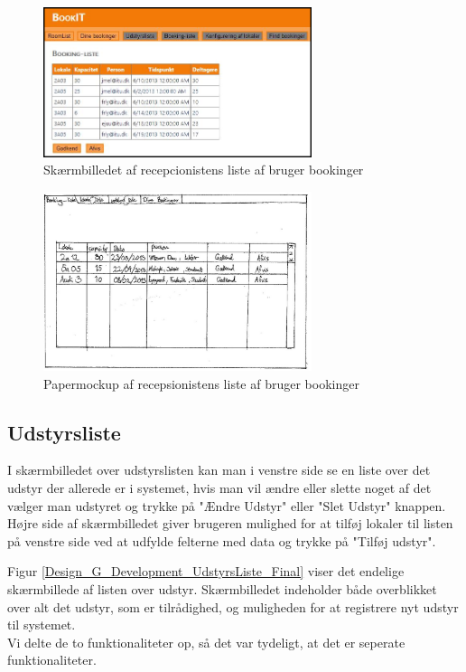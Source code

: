 \begin{figure}[h!]
  \centering
    \includegraphics[width=0.7\textwidth]{Appendix/GUI-Prototype/DigitalMockup/BookingListe}
  \caption{Skærmbilledet af recepcionistens liste af bruger bookinger}
\label{Design_G_Development_BookingListe_Final}
\end{figure} 

\begin{figure}[h!]
  \centering
    \includegraphics[width=0.7\textwidth]{Appendix/GUI-Prototype/PaperMockup/GodkendBookinger_001}
  \caption{Papermockup af recepsionistens liste af bruger bookinger}
\label{Design_G_Development_BookingListe}
\end{figure} 

\subsection{Udstyrsliste}
I skærmbilledet over udstyrslisten kan man i venstre side se en liste over det udstyr der allerede er i systemet, hvis man vil ændre eller slette noget af det vælger man udstyret og trykke på "Ændre Udstyr" eller "Slet Udstyr" knappen. Højre side af skærmbilledet giver brugeren mulighed for at tilføj lokaler til listen på venstre side ved at udfylde felterne med data og trykke på "Tilføj udstyr".

Figur \ref{Design_G_Development_UdstyrsListe_Final} viser det endelige skærmbillede af listen over udstyr.
Skærmbilledet indeholder både overblikket over alt det udstyr, som er tilrådighed, og muligheden for at registrere nyt udstyr til systemet.
\\Vi delte de to funktionaliteter op, så det var tydeligt, at det er seperate funktionaliteter.

